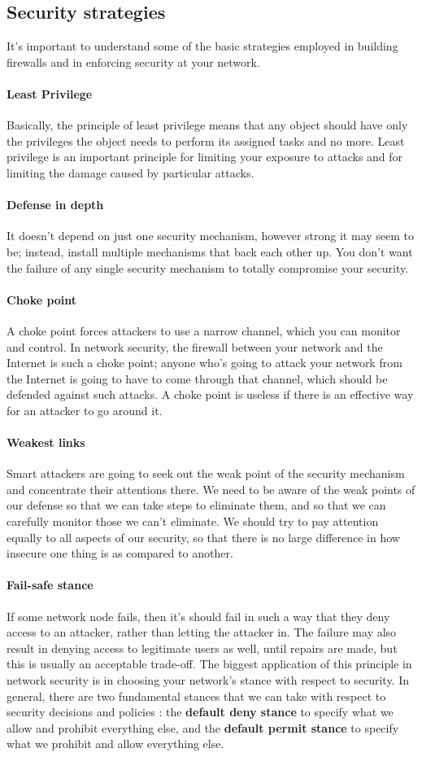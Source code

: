 \documentclass[11pt]{article}
\begin{document}
\subsection{Security strategies}
It's important to understand some of the basic strategies employed in building firewalls and in enforcing security at your network.
\paragraph{Least Privilege} Basically, the principle of least privilege means that any object should have only the privileges the object needs to perform its assigned tasks and no more. Least privilege is an important principle for limiting your exposure to attacks and for limiting the damage caused by particular attacks.
\paragraph{Defense in depth} It doesn't depend on just one security mechanism, however strong it may seem to be; instead, install multiple mechanisms that back each other up. You don't want the failure of any single security mechanism to totally compromise your security.
\paragraph{Choke point} A choke point forces attackers to use a narrow channel, which you can monitor and control. In network security, the firewall between your network and the Internet is such a choke point; anyone who's going to attack your network from the Internet is going to have to come through that channel, which should be defended against such attacks. A choke point is useless if there is an effective way for an attacker to go around it.
\paragraph{Weakest links} Smart attackers are going to seek out the weak point of the security mechanism and concentrate their attentions there. We need to be aware of the weak points of our defense so that we can take steps to eliminate them, and so that we can carefully monitor those we can't eliminate. We should try to pay attention equally to all aspects of our security, so that there is no large difference in how insecure one thing is as compared to another. 
\paragraph{Fail-safe stance} If some network node fails, then it's should fail in such a way that they deny access to an attacker, rather than letting the attacker in. The failure may also result in denying access to legitimate users as well, until repairs are made, but this is usually an acceptable trade-off. The biggest application of this principle in network security is in choosing your network's stance with respect to security. In general, there are two fundamental stances that we can take with respect to security decisions and policies : the \textbf{default deny stance} to specify what we allow and prohibit everything else, and the \textbf{default permit stance} to specify what we prohibit and allow everything else.
\end{document}
